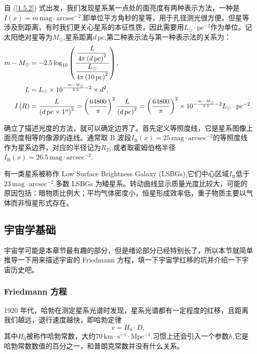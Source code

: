 \documentclass[../天体物理基础.tex]{subfiles}
\begin{document}
自 (\ref{1.5.2}) 式出发，我们发现星系某一点处的面亮度有两种表示方法，一种是$I\left(x\right)=m\,\mathrm{mag\cdot arcsec^{-2}}$,即单位平方角秒的星等，用于孔径测光很方便。但星等涉及到距离，有时我们更关心星系的本征性质，因此需要用$L_{\odot}\cdot\mathrm{pc^{-2}}$作为单位。记太阳绝对星等为$M_{\odot}$,星系距离$d\,\mathrm{pc}$,第二种表示法与第一种表示法的关系为：
\begin{align}
m-M_{\odot}&=-2.5\log_{10}\left(\frac{\dfrac{L}{4\pi\left(d\,\mathrm{pc}\right)^{2}}}{\dfrac{L_{\odot}}{4\pi\left(10\,\mathrm{pc}\right)^{2}}}\right),\notag\\
L&=L_{\odot}\times10^{-\frac{m-M_{\odot}}{2.5}-2}\times d^{2},\notag\\
I\left(R\right)&=\frac{L}{\left(d\,\mathrm{pc}\times1^{\prime\prime}\right)^{2}}=\left(\frac{64800}{\pi}\right)^{2}\frac{L}{\left(d\,\mathrm{pc}\right)^{2}}=\left(\frac{64800}{\pi}\right)^{2}\times10^{-\frac{m-M_{\odot}}{2.5}-2}L_{\odot}\cdot\mathrm{pc}^{-2}.
\end{align}

确立了描述光度的方法，就可以确定边界了。首先定义等照度线，它是星系图像上面亮度相等的像源的连线。通常取 B 波段$I_{\text{B}}(x)=25\,\mathrm{mag\cdot arcsec^{-2}}$的等照度线作为星系边界，对应的半径记为$R_{25}$.或者取霍姆伯格半径$I_{\text{B}}(x)=26.5\,\mathrm{mag\cdot arcsec^{-2}}$.

有一类星系被称作 Low Surface Brightness Galaxy (LSBGs),它们中心区域$I_{\text{B}}$低于$23\,\mathrm{mag\cdot arcsec^{-2}}$.多数 LSBGs 为矮星系。转动曲线显示质量光度比较大，可能的原因包括：暗物质比例大；平均气体密度小，恒星形成效率低，重子物质主要以气体而非恒星形式存在。

\subsection{宇宙学基础}
宇宙学可能是本章节最有趣的部分，但是绪论部分已经特别长了，所以本节就简单推导一下用来描述宇宙的 Friedmann 方程，填一下宇宙学红移的坑并介绍一下宇宙历史吧。

\subsubsection{Friedmann 方程}
1920 年代，哈勃在测定星系光谱时发现，星系光谱都有一定程度的红移，且距离我们越远，退行速度越快，即哈勃定律
\begin{equation}
v=H_{0}\cdot D,
\end{equation}
其中$H_{0}$被称作哈勃常数，大约$70\,\mathrm{km\cdot{}s^{-1}\cdot Mpc^{-1}}$.习惯上还会引入一个参数$h$,它是哈勃常数数值的百分之一，和普朗克常数并没有什么关系。
\end{document}
